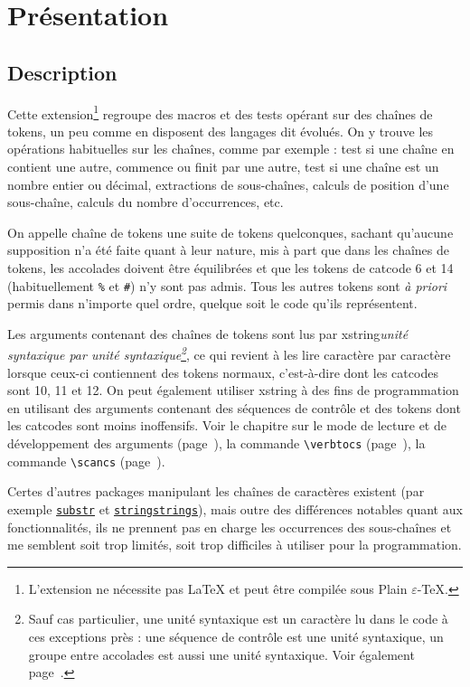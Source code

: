 \documentclass[a4paper,10pt]{article}
\newcommand\guill[1]{\og{}#1\fg{}}
\newcommand\US{unité syntaxique\xspace}
\newcommand\Xstring{\textsf{xstring}\xspace}
\newcommand\verbinline{\lstinline[basicstyle=\normalsize\ttfamily]}
\begin{document}
\tableofcontents

\section{Présentation}
\subsection{Description}
Cette extension\footnote{L'extension ne nécessite pas \LaTeX{} et peut être compilée sous Plain $\varepsilon$-\TeX{}.} regroupe des macros et des tests opérant sur des chaînes de tokens, un peu comme en disposent des langages dit \guill{évolués}. On y trouve les opérations habituelles sur les chaînes, comme par exemple : test si une chaîne en contient une autre, commence ou finit par une autre, test si une chaîne est un nombre entier ou décimal, extractions de sous-chaînes, calculs de position d'une sous-chaîne, calculs du nombre d'occurrences, etc.\medskip

On appelle \guill{chaîne de tokens} une suite de tokens quelconques, sachant qu'aucune supposition n'a été faite quant à leur nature, mis à part que dans les chaînes de tokens, les accolades doivent être équilibrées et que les tokens de catcode 6 et 14 (habituellement \verb|%| et \verb|#|) n'y sont pas admis. Tous les autres tokens sont \emph{à priori} permis dans n'importe quel ordre, quelque soit le code qu'ils représentent.\medskip

Les arguments contenant des chaînes de tokens sont lus par \Xstring \emph{\US par \US\footnote{Sauf cas particulier, une \US est un caractère lu dans le code à ces exceptions près : une séquence de contrôle est une \US, un groupe entre accolades est aussi une \US. Voir également page~\pageref{developpementarguments}.}}, ce qui revient à les lire caractère par caractère lorsque ceux-ci contiennent des tokens \guill{normaux}, c'est-à-dire dont les catcodes sont 10, 11 et 12. On peut également utiliser \Xstring à des fins de programmation en utilisant des arguments contenant des séquences de contrôle et des tokens dont les catcodes sont moins inoffensifs. Voir le chapitre sur le mode de lecture et de développement des arguments (page~\pageref{developpementarguments}), la commande \verbinline|\verbtocs| (page~\pageref{verbtocs}), la commande \verbinline|\scancs| (page~\pageref{scancs}).\medskip

Certes d'autres packages manipulant les chaînes de caractères existent (par exemple \href{http://www.ctan.org/tex-archive/macros/latex/contrib/substr/}{\nolinkurl{substr}} et \href{http://www.ctan.org/tex-archive/macros/latex/contrib/stringstrings/}{\nolinkurl{stringstrings}}), mais outre des différences notables quant aux fonctionnalités, ils ne prennent pas en charge les occurrences des sous-chaînes et me semblent soit trop limités, soit trop difficiles à utiliser pour la programmation.\medskip
\end{document}
